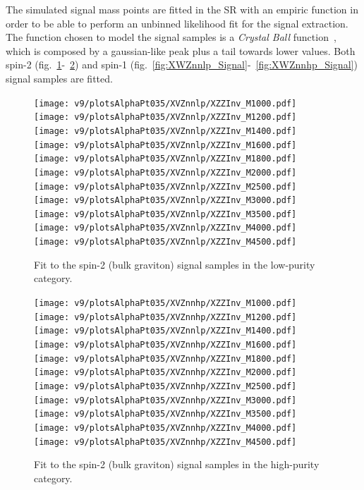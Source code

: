 The simulated signal mass points are fitted in the SR with an empiric function in order to be able to perform an unbinned likelihood fit for the signal extraction. The function chosen to model the signal samples is a \emph{Crystal Ball} function~\cite{Oreglia:1980cs,Skwarnicki:1986xj}, which is composed by a gaussian-like peak plus a tail towards lower values. Both spin-2 (fig.~\ref{fig:XVZnnlp_Signal}-~\ref{fig:XVZnnhp_Signal}) and spin-1 (fig.~\ref{fig:XWZnnlp_Signal}-~\ref{fig:XWZnnhp_Signal}) signal samples are fitted.


\begin{figure}[!htb]
  \centering
    \texttt{[image: v9/plotsAlphaPt035/XVZnnlp/XZZInv\_M1000.pdf]}
    \texttt{[image: v9/plotsAlphaPt035/XVZnnlp/XZZInv\_M1200.pdf]}
    \texttt{[image: v9/plotsAlphaPt035/XVZnnlp/XZZInv\_M1400.pdf]}
     \\
    \texttt{[image: v9/plotsAlphaPt035/XVZnnlp/XZZInv\_M1600.pdf]}
    \texttt{[image: v9/plotsAlphaPt035/XVZnnlp/XZZInv\_M1800.pdf]}
    \texttt{[image: v9/plotsAlphaPt035/XVZnnlp/XZZInv\_M2000.pdf]}
     \\
    \texttt{[image: v9/plotsAlphaPt035/XVZnnlp/XZZInv\_M2500.pdf]}
    \texttt{[image: v9/plotsAlphaPt035/XVZnnlp/XZZInv\_M3000.pdf]}
    \texttt{[image: v9/plotsAlphaPt035/XVZnnlp/XZZInv\_M3500.pdf]}
     \\
    \texttt{[image: v9/plotsAlphaPt035/XVZnnlp/XZZInv\_M4000.pdf]}
    \texttt{[image: v9/plotsAlphaPt035/XVZnnlp/XZZInv\_M4500.pdf]}
  \caption{Fit to the spin-2 (bulk graviton) signal samples in the low-purity category.}
  \label{fig:XVZnnlp_Signal}
\end{figure}


\begin{figure}[!htb]
  \centering
    \texttt{[image: v9/plotsAlphaPt035/XVZnnhp/XZZInv\_M1000.pdf]}
    \texttt{[image: v9/plotsAlphaPt035/XVZnnhp/XZZInv\_M1200.pdf]}
    \texttt{[image: v9/plotsAlphaPt035/XVZnnlp/XZZInv\_M1400.pdf]}
     \\
    \texttt{[image: v9/plotsAlphaPt035/XVZnnhp/XZZInv\_M1600.pdf]}
    \texttt{[image: v9/plotsAlphaPt035/XVZnnhp/XZZInv\_M1800.pdf]}
    \texttt{[image: v9/plotsAlphaPt035/XVZnnhp/XZZInv\_M2000.pdf]}
     \\
    \texttt{[image: v9/plotsAlphaPt035/XVZnnhp/XZZInv\_M2500.pdf]}
    \texttt{[image: v9/plotsAlphaPt035/XVZnnhp/XZZInv\_M3000.pdf]}
    \texttt{[image: v9/plotsAlphaPt035/XVZnnhp/XZZInv\_M3500.pdf]}
     \\
    \texttt{[image: v9/plotsAlphaPt035/XVZnnhp/XZZInv\_M4000.pdf]}
    \texttt{[image: v9/plotsAlphaPt035/XVZnnhp/XZZInv\_M4500.pdf]}
  \caption{Fit to the spin-2 (bulk graviton) signal samples in the high-purity category.}
  \label{fig:XVZnnhp_Signal}
\end{figure}


